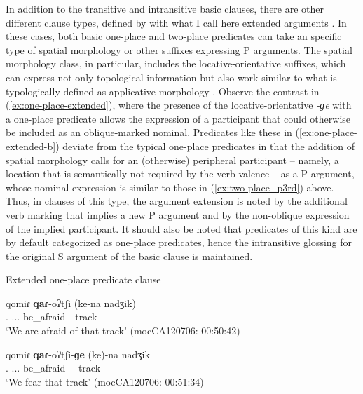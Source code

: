 \documentclass[12pt]{article}
\begin{document}
In addition to the transitive and intransitive basic clauses, there are other different clause types, defined by with what I call here extended arguments \citep[the terminology is inspired by][3--4]{Dixon2000}. In these cases, both basic one-place and two-place predicates can take an specific type of spatial morphology or other suffixes expressing P arguments. The spatial morphology class, in particular, includes the locative-orientative suffixes, which can express not only topological information but also work similar to what is typologically defined as applicative morphology \citep[for an updated discussion of earlier and more recent descriptions of spatial morphology, see][]{juarez2025}.  Observe the contrast in (\ref{ex:one-place-extended}), where the presence of the locative-orientative \textit{-ɡe} with a one-place predicate allows the expression of a participant that could otherwise be included as an oblique-marked nominal. Predicates like these in (\ref{ex:one-place-extended-b}) deviate from the typical one-place predicates in that the addition of spatial morphology calls for an (otherwise) peripheral participant -- namely, a location that is semantically not required by the verb valence -- as a P argument, whose nominal expression is similar to those in (\ref{ex:two-place_p3rd}) above. Thus, in clauses of this type, the argument extension is noted by the additional verb marking that implies a new P argument and by the non-oblique expression of the implied participant. It should also be noted that predicates of this kind are by default categorized  as one-place predicates, hence the intransitive glossing for the original S argument of the basic clause is maintained.  

\begin{exe}
\ex Extended one-place predicate clause \label{ex:one-place-extended}
\begin{xlist}
\ex
\gll qomiɾ \textbf{qaɾ}-oʔtʃi (ke-na nadʒik) \\
	{\First\Pl.\Pron} {\First.\Pl.\I.\Intr}-be\_afraid {\Obl}-{\DetThree} track \\
	\trans `We are afraid of that track' \hfill{(mocCA120706: 00:50:42)} \label{ex:one-place-extended-a}
	
	\ex
\gll qomiɾ \textbf{qaɾ}-oʔtʃi-\textbf{ɡe} (\Ungr ke)-na nadʒik \\
	{\First\Pl.\Pron} {\First.\Pl.\I.\Intr}-be\_afraid-{\LocThree}	 {\Obl}-{\DetThree} track \\
	\trans `We fear that track' \hfill{(mocCA120706: 00:51:34)} \label{ex:one-place-extended-b}
\end{xlist}
\end{exe}
\end{document}
